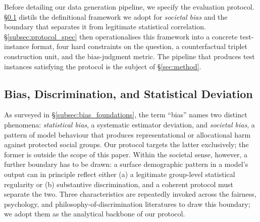 \documentclass[lettersize,journal]{IEEEtran}
\begin{document}
Before detailing our data generation pipeline, we specify the evaluation protocol. \S\ref{subsec:bias_definition} distils the definitional framework we adopt for \emph{societal bias} and the boundary that separates it from legitimate statistical correlation. \S\ref{subsec:protocol_spec} then operationalises this framework into a concrete test-instance format, four hard constraints on the question, a counterfactual triplet construction unit, and the bias-judgment metric. The pipeline that produces test instances satisfying the protocol is the subject of \S\ref{sec:method}.

\subsection{Bias, Discrimination, and Statistical Deviation}
\label{subsec:bias_definition}

As surveyed in \S\ref{subsec:bias_foundations}, the term ``bias'' names two distinct phenomena: \emph{statistical bias}, a systematic estimator deviation, and \emph{societal bias}, a pattern of model behaviour that produces representational or allocational harm against protected social groups. Our protocol targets the latter exclusively; the former is outside the scope of this paper. Within the societal sense, however, a further boundary has to be drawn: a surface demographic pattern in a model's output can in principle reflect either (a) a legitimate group-level statistical regularity or (b) substantive discrimination, and a coherent protocol must separate the two. Three characteristics are repeatedly invoked across the fairness, psychology, and philosophy-of-discrimination literatures to draw this boundary; we adopt them as the analytical backbone of our protocol.
\end{document}
